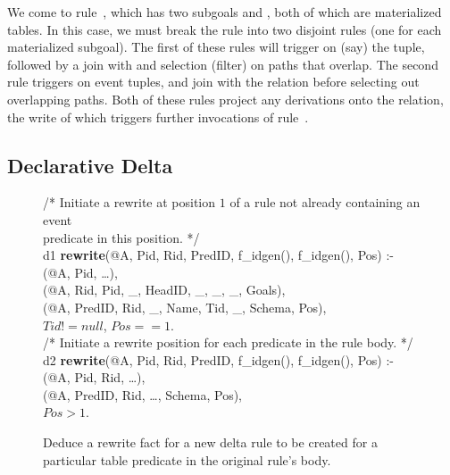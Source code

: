 We come to rule~, which has two subgoals  and , both
of which are materialized tables.  In this case, we must break the rule into
two disjoint rules (one for each materialized subgoal).  The first of these
rules will trigger on (say) the  tuple, followed by a join with
 and selection (filter) on paths that overlap.  The second rule
triggers on  event tuples, and join with the  relation before
selecting out overlapping paths.  Both of these rules project any derivations
onto the  relation, the write of which triggers further invocations
of rule~.

\subsection{Declarative Delta}

\begin{figure}[!t]
\ssp
\centering
\begin{boxedminipage}{\linewidth}
/* Initiate a rewrite at position $1$ of a rule not already containing an event \\
   predicate in this position. */ \\
d1 {\bf rewrite}(@A, Pid, Rid, PredID, f\_idgen(), f\_idgen(), Pos) :- \\
(@A, Pid, \ldots), \\
(@A, Rid, Pid, \_, HeadID, \_, \_, \_, Goals), \\
(@A, PredID, Rid, \_, Name, Tid, \_, Schema, Pos), \\
\datalogspace $Tid != null$, $Pos == 1$. \\

/* Initiate a rewrite position for each predicate in the rule body. */ \\
d2 {\bf rewrite}(@A, Pid, Rid, PredID, f\_idgen(), f\_idgen(), Pos) :- \\
(@A, Pid, Rid, \ldots), \\
(@A, PredID, Rid, \ldots, Schema, Pos), \\
\datalogspace $Pos > 1$. \\

\end{boxedminipage}
\caption{\label{ch:evita:fig:delta1}Deduce a rewrite fact for a new delta rule to be
created for a particular table predicate in the original rule's body.}
\end{figure}

